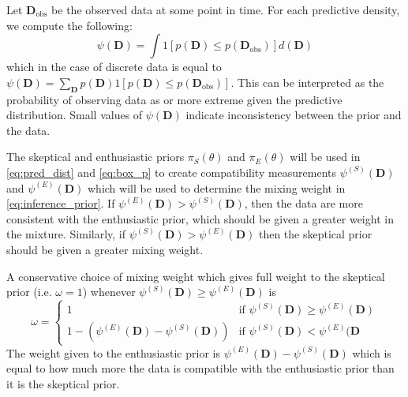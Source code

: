 \documentclass[useAMS,usenatbib,referee]{biom}
\begin{document}
Let $\mathbf{D}_{\text{obs}}$ be the observed data at some point in time. For each predictive density, we compute the following:
\begin{equation}\label{eq:box_p}
\psi(\mathbf{D})=\int 1[p(\mathbf{D})\leq p(\mathbf{D}_{\text{obs}})] d(\mathbf{D})
\end{equation}
which in the case of discrete data is equal to $\psi(\mathbf{D})=\sum_{\mathbf{D}}p(\mathbf{D})1[p(\mathbf{D})\leq p(\mathbf{D}_{\text{obs}})]$.
This can be interpreted as the probability of observing data as or more extreme given the predictive distribution. Small values of $\psi(\mathbf{D})$ indicate inconsistency between the prior and the data. 

The skeptical and enthusiastic priors $\pi_S(\theta)$ and $\pi_E(\theta)$ will be used in \eqref{eq:pred_dist} and \eqref{eq:box_p} to create compatibility measurements $\psi^{(S)}(\mathbf{D})$ and $\psi^{(E)}(\mathbf{D})$ which will be used to determine the mixing weight in \eqref{eq:inference_prior}. If $\psi^{(E)}(\mathbf{D})>\psi^{(S)}(\mathbf{D})$, then the data are more consistent with the enthusiastic prior, which should be given a greater weight in the mixture. Similarly, if $\psi^{(S)}(\mathbf{D})>\psi^{(E)}(\mathbf{D})$ then the skeptical prior should be given a greater mixing weight.

A conservative choice of mixing weight which gives full weight to the skeptical prior (i.e. $\omega=1$) whenever $\psi^{(S)}(\mathbf{D})\geq \psi^{(E)}(\mathbf{D})$ is
\begin{equation}\label{eq:adaptive_prior}
\omega=\begin{cases} 
      1 & \text{if } \psi^{(S)}(\mathbf{D})\geq \psi^{(E)}(\mathbf{D}) \\
      1-(\psi^{(E)}(\mathbf{D})-\psi^{(S)}(\mathbf{D})) &\text{if } \psi^{(S)}(\mathbf{D})< \psi^{(E)}(\mathbf{D}
   \end{cases}
\end{equation}
The weight given to the enthusiastic prior is $\psi^{(E)}(\mathbf{D})-\psi^{(S)}(\mathbf{D})$ which is equal to how much more the data is compatible with the enthusiastic prior than it is the skeptical prior.
%
\end{document}
